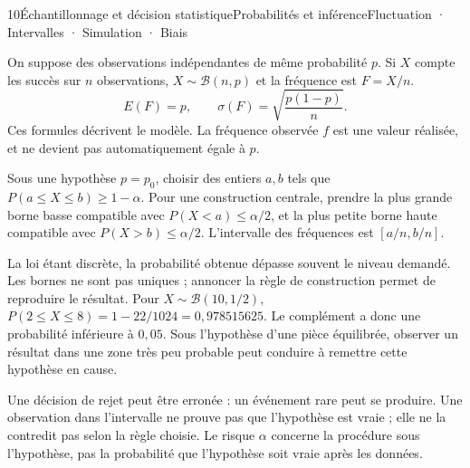 \begin{ouverture}[grandsnombres]{10}{Échantillonnage et décision statistique}{Probabilités et inférence}{Fluctuation · Intervalles · Simulation · Biais}
\end{ouverture}
\essentiel

On suppose des observations indépendantes de même probabilité $p$. Si $X$ compte les succès sur $n$ observations, $X\sim\mathcal B(n,p)$ et la fréquence est $F=X/n$.
\[E(F)=p,\qquad \sigma(F)=\sqrt{\frac{p(1-p)}n}.\]
Ces formules décrivent le modèle. La fréquence observée $f$ est une valeur réalisée, et ne devient pas automatiquement égale à $p$.
\begin{savoirfaire}
Sous une hypothèse $p=p_0$, choisir des entiers $a,b$ tels que
$P(a\leq X\leq b)\geq1-\alpha$.
Pour une construction centrale, prendre la plus grande borne basse compatible avec $P(X<a)\leq\alpha/2$, et la plus petite borne haute compatible avec $P(X>b)\leq\alpha/2$.
L'intervalle des fréquences est $[a/n,b/n]$.
\end{savoirfaire}
La loi étant discrète, la probabilité obtenue dépasse souvent le niveau demandé. Les bornes ne sont pas uniques ; annoncer la règle de construction permet de reproduire le résultat.
Pour $X\sim\mathcal B(10,1/2)$, $P(2\leq X\leq8)=1-22/1024=0{,}978515625$.
Le complément a donc une probabilité inférieure à $0{,}05$.
Sous l'hypothèse d'une pièce équilibrée, observer un résultat dans une zone très peu probable peut conduire à remettre cette hypothèse en cause.
\begin{attention}
Une décision de rejet peut être erronée : un événement rare peut se produire. Une observation dans l'intervalle ne prouve pas que l'hypothèse est vraie ; elle ne la contredit pas selon la règle choisie.
Le risque $\alpha$ concerne la procédure sous l'hypothèse, pas la probabilité que l'hypothèse soit vraie après les données.
\end{attention}
